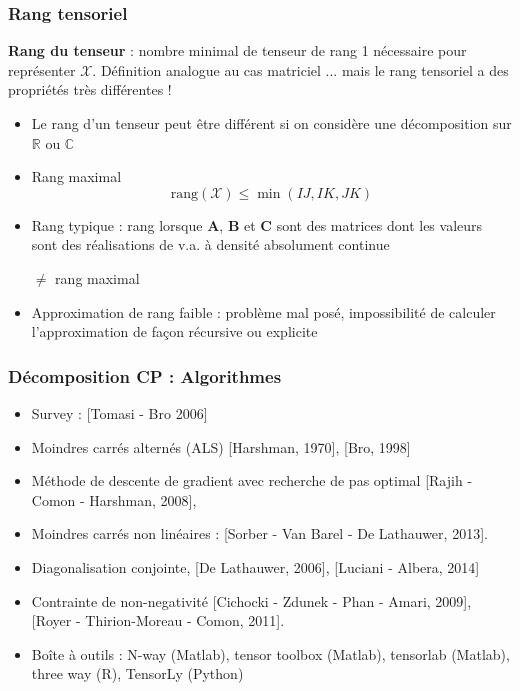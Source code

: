 \documentclass[9pt,table]{beamer} %
\begin{document}
\begin{frame}\frametitle{Rang tensoriel}

\textbf{Rang du tenseur} : nombre minimal de tenseur de rang 1 nécessaire pour représenter 
$\mathcal{X}$.
Définition analogue au cas matriciel ... mais le rang tensoriel a des propriétés très différentes !
\\[1ex]
\begin{itemize}[label=\tiny$\blacksquare$]
\item Le rang d'un tenseur peut être différent si on considère une décomposition sur $\mathbb{R}$ ou $\mathbb{C}$
\item \alert{Rang maximal}
\[
\text{rang}(\mathcal{X}) \leq \min (IJ, IK, JK)
\]
\item \alert{Rang typique} : rang lorsque $\mathbf{A}$, $\mathbf{B}$ et $\mathbf{C}$ sont des matrices dont les valeurs sont des réalisations de v.a. à densité absolument continue 

$\neq$ rang maximal
\item Approximation de rang faible : problème mal posé, impossibilité de calculer l'approximation de façon récursive ou explicite
\end{itemize}
\end{frame}

\begin{frame}
\frametitle{Décomposition CP : Algorithmes}

\begin{itemize}[label=\tiny$\blacksquare$]
\item Survey :  [Tomasi - Bro 2006]  
\item Moindres carrés alternés (ALS) [Harshman, 1970], [Bro, 1998]
\item Méthode de descente de gradient avec recherche de pas optimal
[Rajih - Comon - Harshman, 2008], 
\item Moindres carrés non linéaires :
[Sorber - Van Barel - De Lathauwer, 2013]. 
\item Diagonalisation conjointe, 
[De Lathauwer, 2006], [Luciani - Albera, 2014]
\item Contrainte de non-negativité [Cichocki - Zdunek - Phan -  Amari, 2009], [Royer - Thirion-Moreau - Comon, 2011]. 
\item Boîte à outils : N-way (Matlab), tensor toolbox (Matlab), tensorlab (Matlab), three way (R), TensorLy (Python)
\end{itemize}
\end{frame}
\end{document}
